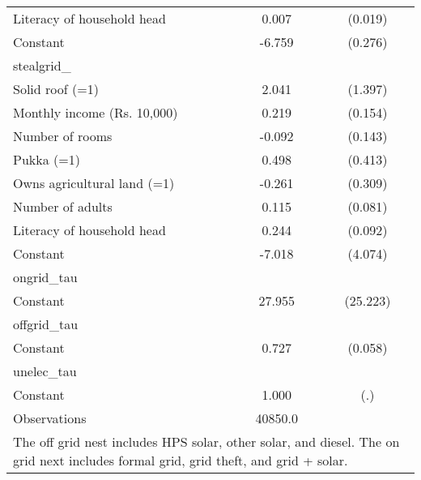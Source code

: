 \begin{table}[htbp]
\begin{tabular}{l*{1}{cc}}
Literacy of household head&       0.007         &     (0.019)\\
Constant            &      -6.759\sym{***}&     (0.276)\\
\midrule
stealgrid\_          &                     &            \\
Solid roof (=1)     &       2.041         &     (1.397)\\
Monthly income (Rs. 10,000)&       0.219         &     (0.154)\\
Number of rooms     &      -0.092         &     (0.143)\\
Pukka (=1)          &       0.498         &     (0.413)\\
Owns agricultural land (=1)&      -0.261         &     (0.309)\\
Number of adults    &       0.115         &     (0.081)\\
Literacy of household head&       0.244\sym{***}&     (0.092)\\
Constant            &      -7.018\sym{*}  &     (4.074)\\
\midrule
ongrid\_tau          &                     &            \\
Constant            &      27.955         &    (25.223)\\
\midrule
offgrid\_tau         &                     &            \\
Constant            &       0.727\sym{***}&     (0.058)\\
\midrule
unelec\_tau          &                     &            \\
Constant            &       1.000         &         (.)\\
\midrule
Observations        &     40850.0         &            \\
\bottomrule
\multicolumn{3}{l}{\footnotesize The off grid nest includes HPS solar, other solar, and diesel.                 The on grid next includes formal grid, grid theft, and grid + solar.}\\
\end{tabular}
\end{table}
